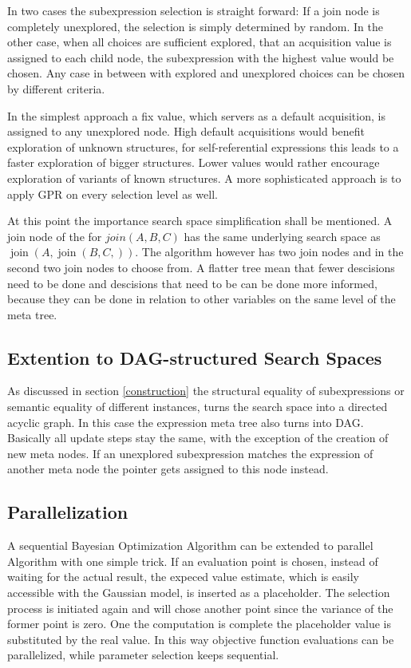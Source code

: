 \documentclass[english]{article}
\newcommand{\join}{\operatorname{join}}
\begin{document}
In two cases the subexpression selection is straight forward: If a join node is completely unexplored, the selection is simply determined by random. In the other case, when all choices are sufficient explored, that an acquisition value is assigned to each child node, the subexpression with the highest value would be chosen. Any case in between with explored and unexplored choices can be chosen by different criteria.

In the simplest approach a fix value, which servers as a default acquisition, is assigned to any unexplored node. High default acquisitions would benefit exploration of unknown structures, for self-referential expressions this leads to a faster exploration of bigger structures. Lower values would rather encourage exploration of variants of known structures.
A more sophisticated approach is to apply GPR on every selection level as well.

At this point the importance search space simplification shall be mentioned. A join node of the for $join(A,B,C)$ has the same underlying search space as $\join(A,\join(B,C,))$. The algorithm however has two join nodes and in the second two join nodes to choose from. A flatter tree mean that fewer descisions need to be done and descisions that need to be can be done more informed, because they can be done in relation to other variables on the same level of the meta tree.

\subsection{Extention to DAG-structured Search Spaces}
As discussed in section \ref{construction} the structural equality of subexpressions or semantic equality of different instances, turns the search space into a directed acyclic graph. In this case the expression meta tree also turns into DAG. Basically all update steps stay the same, with the exception of the creation of new meta nodes. If an unexplored subexpression matches the expression of another meta node the pointer gets assigned to this node instead.

\subsection{Parallelization}
A sequential Bayesian Optimization Algorithm can be extended to parallel Algorithm with one simple trick. If an evaluation point is chosen, instead of waiting for the actual result, the expeced value estimate, which is easily accessible with the Gaussian model, is inserted as a placeholder. The selection process is initiated again and will chose another point since the variance of the former point is zero. One the computation is complete the placeholder value is substituted by the real value. In this way objective function evaluations can be parallelized, while parameter selection keeps sequential.
\end{document}
